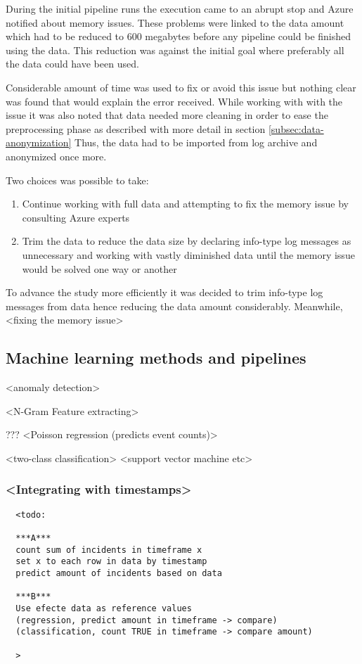 \documentclass[english, 12pt, a4paper, elec, utf8, a-1b, online]{aaltothesis}
\begin{document}
During the initial pipeline runs
the execution came to an abrupt stop
and Azure notified about memory issues.
These problems were linked to the data amount
which had to be reduced to 600 megabytes
before any pipeline could be finished using the data.
This reduction was against the initial goal
where preferably all the data could have been used.

Considerable amount of time was used
to fix or avoid this issue
but nothing clear was found
that would explain the error received.
While working with with the issue
it was also noted
that data needed more cleaning
in order to ease the preprocessing phase
as described with more detail in section \ref{subsec:data-anonymization}
Thus,
the data had to be imported from log archive
and anonymized once more.

Two choices was possible to take:
\begin{enumerate}
  \item Continue working with full data
  and attempting to fix the memory issue
  by consulting Azure experts
  \item  Trim the data to reduce the data size
  by declaring info-type log messages
  as unnecessary
  and working with vastly diminished data
  until the memory issue would be solved
  one way or another
\end{enumerate}

To advance the study more efficiently
it was decided to trim info-type log messages from data
hence reducing the data amount considerably.
Meanwhile,
<fixing the memory issue>

\subsection{Machine learning methods and pipelines}\label{subsec:machine-learning-methods-and-pipelines}

<anomaly detection>

<N-Gram Feature extracting>

???
<Poisson regression (predicts event counts)>

<two-class classification>
<support vector machine etc>



\subsubsection*{<Integrating with timestamps>}


\begin{verbatim}
  <todo:

  ***A***
  count sum of incidents in timeframe x
  set x to each row in data by timestamp
  predict amount of incidents based on data

  ***B***
  Use efecte data as reference values
  (regression, predict amount in timeframe -> compare)
  (classification, count TRUE in timeframe -> compare amount)

  >
\end{verbatim}
\end{document}
